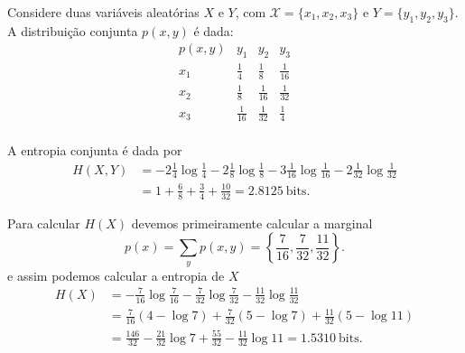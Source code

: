 \begin{example}
  Considere duas variáveis aleatórias $X$ e $Y$, com $\mathcal{X} = \{x_1, x_2, x_3\}$ e
  $Y = \{y_1, y_2, y_3\}$. A distribuição conjunta $p(x,y)$ é dada:
\begin{equation*}
\begin{array}{c|ccc}
p(x,y) & y_1 & y_2 & y_3 \\
\hline
x_1 & \frac{1}{4} & \frac{1}{8} & \frac{1}{16} \\
x_2 & \frac{1}{8} & \frac{1}{16} & \frac{1}{32} \\
x_3 & \frac{1}{16} & \frac{1}{32} & \frac{1}{4} \\
\end{array}
\end{equation*}

A entropia conjunta é dada por
\begin{align*}
	H(X,Y) &= -2\frac{1}{4}\log\frac{1}{4} -2\frac{1}{8}\log\frac{1}{8} -3\frac{1}{16}\log\frac{1}{16} -2\frac{1}{32}\log\frac{1}{32} \\
	       &= 1 + \frac{6}{8} + \frac{3}{4} + \frac{10}{32} = 2.8125 \ \text{bits}.
\end{align*}

Para calcular $H(X)$ devemos primeiramente calcular a marginal
\begin{equation*}
  p(x) = \sum_y p(x,y) = \left\{ \frac{7}{16}, \frac{7}{32}, \frac{11}{32} \right\}.
\end{equation*}
e assim podemos calcular a entropia de $X$
\begin{align*}
  H(X) &= -\frac{7}{16}\log\frac{7}{16} -\frac{7}{32}\log\frac{7}{32} -\frac{11}{32}\log\frac{11}{32} \\
       &= \frac{7}{16}(4 - \log 7) + \frac{7}{32}(5 - \log 7) + \frac{11}{32}(5 - \log 11) \\
       &= \frac{146}{32} - \frac{21}{32} \log 7 + \frac{55}{32} - \frac{11}{32} \log 11 = 1.5310 \ \text{bits}. 
\end{align*}


\end{example}
